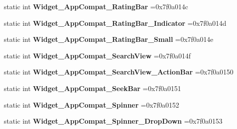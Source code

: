 \begin{DoxyCompactItemize}
static int {\bfseries Widget\+\_\+\+App\+Compat\+\_\+\+Rating\+Bar} =0x7f0a014c
\item 
\mbox{\label{classandroid_1_1support_1_1v7_1_1cardview_1_1R_1_1style_ae4e40d5f4c2a87da4ec4aa6e9163ec6d}} 
static int {\bfseries Widget\+\_\+\+App\+Compat\+\_\+\+Rating\+Bar\+\_\+\+Indicator} =0x7f0a014d
\item 
\mbox{\label{classandroid_1_1support_1_1v7_1_1cardview_1_1R_1_1style_a0942fe754ffd63d6d490c35737e8065b}} 
static int {\bfseries Widget\+\_\+\+App\+Compat\+\_\+\+Rating\+Bar\+\_\+\+Small} =0x7f0a014e
\item 
\mbox{\label{classandroid_1_1support_1_1v7_1_1cardview_1_1R_1_1style_aa2f5d8182387e97c122cc410ddbfd295}} 
static int {\bfseries Widget\+\_\+\+App\+Compat\+\_\+\+Search\+View} =0x7f0a014f
\item 
\mbox{\label{classandroid_1_1support_1_1v7_1_1cardview_1_1R_1_1style_a8ce48526ced0ff3d073eeed0fcda37af}} 
static int {\bfseries Widget\+\_\+\+App\+Compat\+\_\+\+Search\+View\+\_\+\+Action\+Bar} =0x7f0a0150
\item 
\mbox{\label{classandroid_1_1support_1_1v7_1_1cardview_1_1R_1_1style_a21318a46dee1e5ac24144076935dc571}} 
static int {\bfseries Widget\+\_\+\+App\+Compat\+\_\+\+Seek\+Bar} =0x7f0a0151
\item 
\mbox{\label{classandroid_1_1support_1_1v7_1_1cardview_1_1R_1_1style_aea81ef88ea6415cd28704ef4bbec8dd5}} 
static int {\bfseries Widget\+\_\+\+App\+Compat\+\_\+\+Spinner} =0x7f0a0152
\item 
\mbox{\label{classandroid_1_1support_1_1v7_1_1cardview_1_1R_1_1style_aaa52b2ef0c51ce76e7e508ecdc67734e}} 
static int {\bfseries Widget\+\_\+\+App\+Compat\+\_\+\+Spinner\+\_\+\+Drop\+Down} =0x7f0a0153
\item 
\mbox{\label{classandroid_1_1support_1_1v7_1_1cardview_1_1R_1_1style_a65e80326124cb8b0a5fdbcf86847ea83}} 

\end{DoxyCompactItemize}
